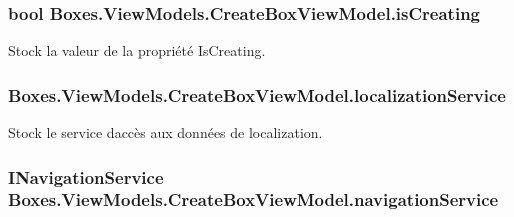\subsubsection[{\texorpdfstring{is\+Creating}{isCreating}}]{\setlength{\rightskip}{0pt plus 5cm}bool Boxes.\+View\+Models.\+Create\+Box\+View\+Model.\+is\+Creating\hspace{0.3cm}{\ttfamily [private]}}\hypertarget{class_boxes_1_1_view_models_1_1_create_box_view_model_ad4145991b27c3fcddb5e8142f016fddd}{}\label{class_boxes_1_1_view_models_1_1_create_box_view_model_ad4145991b27c3fcddb5e8142f016fddd}


Stock la valeur de la propriété {\ttfamily Is\+Creating}. 

\subsubsection[{\texorpdfstring{localization\+Service}{localizationService}}]{ Boxes.\+View\+Models.\+Create\+Box\+View\+Model.\+localization\+Service\hspace{0.3cm}{\ttfamily [private]}}\hypertarget{class_boxes_1_1_view_models_1_1_create_box_view_model_a050aeaedf44bac7ae4299524e5c96657}{}\label{class_boxes_1_1_view_models_1_1_create_box_view_model_a050aeaedf44bac7ae4299524e5c96657}


Stock le service d\textquotesingle{}accès aux données de localization. 

\subsubsection[{\texorpdfstring{navigation\+Service}{navigationService}}]{\setlength{\rightskip}{0pt plus 5cm}I\+Navigation\+Service Boxes.\+View\+Models.\+Create\+Box\+View\+Model.\+navigation\+Service\hspace{0.3cm}{\ttfamily [private]}}\hypertarget{class_boxes_1_1_view_models_1_1_create_box_view_model_a221f3343f2eb1a4016c0e70705b75245}{}\label{class_boxes_1_1_view_models_1_1_create_box_view_model_a221f3343f2eb1a4016c0e70705b75245}



